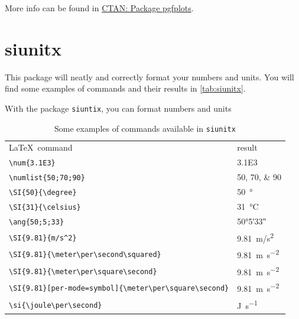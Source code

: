 More info can be found in \href{https://ctan.org/pkg/pgfplots?lang=en}{CTAN: Package pgfplots}.

\section{siunitx}\label{sec:siunitx}
This package will neatly and correctly format your numbers and units. You will find some examples of commands and their results in \cref{tab:siunitx}.

\begin{frame}[fragile]{With the package \texttt{siuntix}, you can format numbers and units}\scriptsizebeamer
    \begin{table}\centering
        \caption{Some examples of commands available in \texttt{siunitx}}
            \begin{tabular}{ll}
                \toprule
                \LaTeX\ command & result \\[+1ex]
                \verb|\num{3.1E3}| & \num{3.1E3} \\ %
                \verb|\numlist{50;70;90}| & \numlist{50;70;90}\\ %
                \verb|\SI{50}{\degree}| & \SI{50}{\degree}\\ %
                \verb|\SI{31}{\celsius}| & \SI{31}{\celsius}\\ %
                \verb|\ang{50;5;33}| & \ang{50;5;33}\\ %
                \verb|\SI{9.81}{m/s^2}| & \SI{9.81}{m/s^2} \\ %
                \verb|\SI{9.81}{\meter\per\second\squared}| & \SI{9.81}{\meter\per\second\squared} \\ %
                \verb|\SI{9.81}{\meter\per\square\second}| & \SI{9.81}{\meter\per\square\second} \\ %
                \verb|\SI{9.81}[per-mode=symbol]{\meter\per\square\second}| & \SI[per-mode=symbol]{9.81}{\meter\per\square\second} \\ %
                \verb|\si{\joule\per\second}| & \si{\joule\per\second} \\ %

\end{tabular}
\end{table}
\end{frame}
